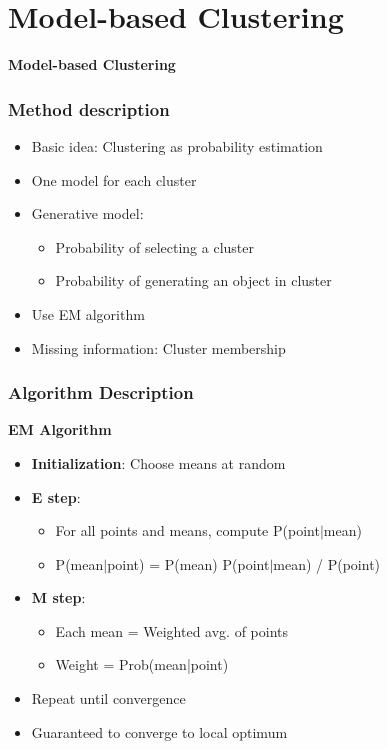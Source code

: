 \documentclass{beamer}
\begin{document}

\section{Model-based Clustering}
\begin{frame}
\begin{center}
\textbf{Model-based Clustering}
\end{center} 
\end{frame}
\begin{frame}
\frametitle{Method description}
\begin{center}
 \begin{itemize}
 \item Basic idea: Clustering as probability estimation
\item One model for each cluster
\item Generative model:
\begin{itemize}
\item Probability of selecting a cluster
\item Probability of generating an object in cluster
\end{itemize}
\item Use EM algorithm
\item Missing information: Cluster membership

 \end{itemize}
\end{center}
\end{frame}





\begin{frame}
\frametitle{Algorithm Description}
\textbf{EM Algorithm}
\begin{center}
  \begin{itemize}
  \item \textbf{Initialization}: Choose means at random
\item \textbf{E step}:
\begin{itemize}
\item For all points and means, compute P(point$|$mean)
\item P(mean$|$point) = P(mean) P(point$|$mean) / P(point)
\end{itemize}
\item \textbf{M step}:
\begin{itemize}
\item Each mean = Weighted avg. of points
\item Weight = Prob(mean|point)
\end{itemize}
\item Repeat until convergence
\item Guaranteed to converge to local optimum
\end{itemize}
\end{center}
\end{frame}
\end{document}
